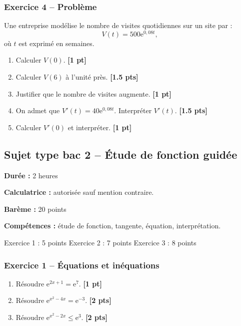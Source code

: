 \documentclass[11pt,a4paper]{article}
\newcommand{\e}{\mathrm{e}}
\newcommand{\pts}[1]{\hfill \textbf{[#1 pt]}}
\newcommand{\ptss}[1]{\hfill \textbf{[#1 pts]}}
\newcommand{\competences}[1]{\textbf{Compétences :} #1}
\newcommand{\calculatrice}{\textbf{Calculatrice :} autorisée sauf mention contraire.}
\newcommand{\duree}[1]{\textbf{Durée :} #1}
\newcommand{\bareme}[1]{\textbf{Barème :} #1}
\begin{document}
\subsubsection*{Exercice 4 -- Problème}

Une entreprise modélise le nombre de visites quotidiennes sur un site par :
\[
V(t)=500\e^{0,08t},
\]
où $t$ est exprimé en semaines.
\begin{enumerate}
    \item Calculer $V(0)$. \pts{1}
    \item Calculer $V(6)$ à l'unité près. \ptss{1.5}
    \item Justifier que le nombre de visites augmente. \pts{1}
    \item On admet que $V'(t)=40\e^{0,08t}$. Interpréter $V'(t)$. \ptss{1.5}
    \item Calculer $V'(0)$ et interpréter. \pts{1}
\end{enumerate}

\newpage

\subsection*{Sujet type bac 2 -- Étude de fonction guidée}

\begin{sujetbox}
\duree{2 heures}

\calculatrice

\bareme{20 points}

\competences{étude de fonction, tangente, équation, interprétation.}
\end{sujetbox}

\begin{baremebox}
Exercice 1 : 5 points \quad
Exercice 2 : 7 points \quad
Exercice 3 : 8 points
\end{baremebox}

\subsubsection*{Exercice 1 -- Équations et inéquations}

\begin{enumerate}
    \item Résoudre $\e^{2x+1}=\e^{7}$. \pts{1}
    \item Résoudre $\e^{x^2-4x}=\e^{-3}$. \ptss{2}
    \item Résoudre $\e^{x^2-2x}\leq \e^3$. \ptss{2}
\end{enumerate}
\end{document}

